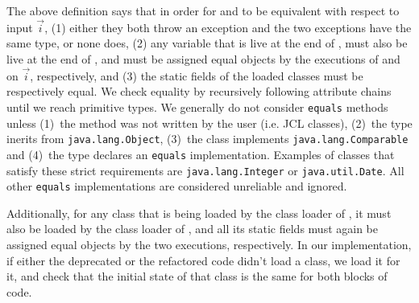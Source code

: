 \documentclass[sigconf,review,anonymous]{acmart}
\begin{document}
The above definition says that in order for  and
 to be equivalent with respect to input $\vec{i}$,
(1) either they both throw an exception and the two exceptions have the same type, or none does,
(2) any variable
that is live at the end of , must also be live at the end of , and  must be
assigned equal objects by the executions of  and
 on $\vec{i}$, respectively, and
(3) the static fields of the loaded classes must be respectively equal.  We
check equality by recursively following attribute chains until we reach
primitive types.  We generally do not consider \texttt{equals} methods
unless (1)~the method was not written by the user (i.e.  JCL classes),
(2)~the type inerits from \texttt{java.lang.Object}, (3)~the class
implements \texttt{java.lang.Comparable} and (4)~the type declares an
\texttt{equals} implementation.  Examples of classes that satisfy these
strict requirements are \texttt{java.lang.Integer} or
\texttt{java.util.Date}.  All other \texttt{equals} implementations are
considered unreliable and ignored.


Additionally, for any class that
is being loaded by the class loader of , it must also be loaded by the class loader of , and
all its static fields must again be assigned equal objects by the
two executions, respectively. 
In our implementation, if either the deprecated or the refactored code didn't load a class, we load it for it,
and check that the initial state of that class is the same for both blocks of code.



\end{document}
